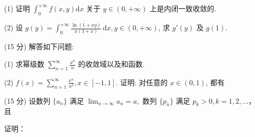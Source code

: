 (1) 证明 $\int_0^{+\infty} f(x, y) \mathrm{d}x$ 关于 $y \in (0, +\infty)$ 上是内闭一致收敛的.\par
(2) 设 $g(y) = \int_{0}^{+\infty} \frac{\ln(1 + xy)}{x(1 + x)} \, \mathrm{d}x, y \in (0, +\infty)$, 求 $g'(y)$ 及 $g(1)$.\par
(15 分) 解答如下问题:\par
(1) 求幂级数 $\sum_{n=1}^{\infty} \frac{x^n}{n}$ 的收敛域以及和函数.\par
\par{}
(2) $f(x) = \sum_{n=1}^{\infty} \frac{x^n}{n^2}, x \in [-1, 1]$. 证明: 对任意的 $x \in (0, 1)$, 都有\par
\nopagebreak[4]
\par{}
(15 分) 设数列 $\{a_{n}\}$ 满足 $\lim_{n\to \infty}a_n = a,$ 数列 $\{p_n\}$ 满足 $p_k > 0, k = 1,2,\dots$，且\par
\nopagebreak[4]
\par{}
证明：\par
\nopagebreak[4]
